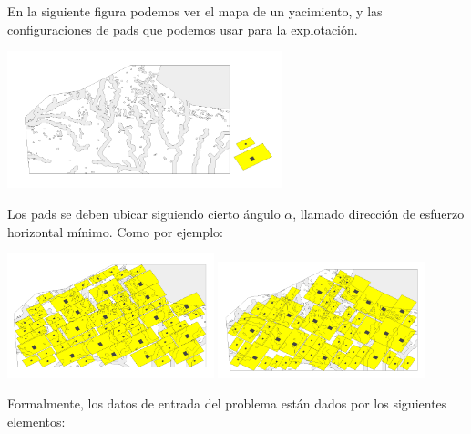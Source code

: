 En la siguiente figura podemos ver  el mapa de un yacimiento, y las configuraciones de pads que
podemos usar para la explotaci\'on.

\begin{center}
\includegraphics[width=0.6\textwidth]{imagenes/figura4}
\end{center}

Los pads se deben ubicar siguiendo cierto \'angulo $\alpha$, llamado direcci\'on de esfuerzo horizontal m\'inimo.
Como por ejemplo:

\begin{center}
\includegraphics[width=0.45\textwidth]{imagenes/figura5}
\includegraphics[width=0.45\textwidth]{imagenes/figura6}
\end{center}

Formalmente, los datos de entrada del problema est\'an dados por los siguientes
elementos:

